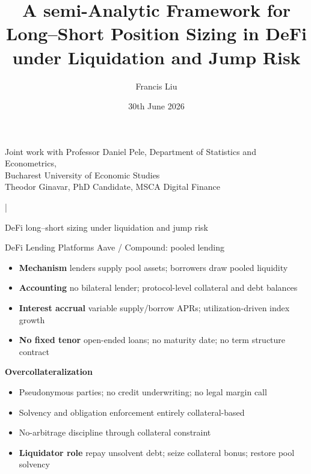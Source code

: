 \documentclass[aspectratio=169,10pt]{beamer}
\title[A semi-analytic framework for DeFi long--short sizing]{A semi-Analytic Framework for Long--Short Position Sizing in DeFi under Liquidation and Jump Risk}
\author{Francis Liu}
\institute{Academic hour}
\date{30th June 2026}
\begin{document}
\begin{frame}
  \vspace{1.0em}
  {\inserttitle\par}
  \vspace{1.2em}
  {\insertauthor\par}
  \vspace{0.7em}
  {
    Joint work with Professor Daniel Pele, Department of Statistics and Econometrics,\\
    Bucharest University of Economic Studies\\
    Theodor Ginavar, PhD Candidate, MSCA Digital Finance\par}
  {\insertinstitute\hspace{0.6em}|\hspace{0.6em}\insertdate\par}
  \vfill
  \begin{center}
  \end{center}
  \vspace{0.8em}
  \large DeFi long--short sizing under liquidation and jump risk
\end{frame}

\begin{frame}{DeFi Lending Platforms}
  \small
  Aave / Compound: pooled lending
  \vspace{0.4em}

  \begin{itemize}
    \item \textbf{Mechanism} lenders supply pool assets; borrowers draw pooled liquidity
    \item \textbf{Accounting} no bilateral lender; protocol-level collateral and debt balances
    \item \textbf{Interest accrual} variable supply/borrow APRs; utilization-driven index growth
    \item \textbf{No fixed tenor} open-ended loans; no maturity date; no term structure contract
  \end{itemize}

  \vspace{0.25em}
  \textbf{Overcollateralization}
  \begin{itemize}
    \item Pseudonymous parties; no credit underwriting; no legal margin call
    \item Solvency and obligation enforcement entirely collateral-based
    \item No-arbitrage discipline through collateral constraint
    \item \textbf{Liquidator role} repay unsolvent debt; seize collateral bonus; restore pool solvency
  \end{itemize}

\end{frame}
\end{document}
